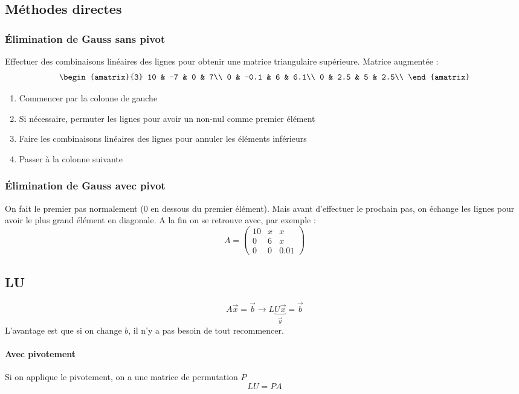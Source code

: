 \documentclass[resume]{subfiles}
\begin{document}
	\subsection{Méthodes directes}
	\subsubsection{Élimination de Gauss sans pivot}
	Effectuer des combinaisons linéaires des lignes pour obtenir une matrice triangulaire supérieure. Matrice augmentée :
	$$\begin{amatrix}{3}
10 & -7 & 0 & 7\\
0 & -0.1 & 6 & 6.1\\
0 & 2.5 & 5 & 2.5\\
\end{amatrix}$$
\begin{enumerate}
\item Commencer par la colonne de gauche
\item Si nécessaire, permuter les lignes pour avoir un non-nul comme premier élément
\item Faire les combinaisons linéaires des lignes pour annuler les éléments inférieurs
\item Passer à la colonne suivante
\end{enumerate}
\subsubsection{Élimination de Gauss avec pivot}
On fait le premier pas normalement (0 en dessous du premier élément). Mais avant d'effectuer le prochain pas, on échange les lignes pour avoir le plus grand élément en diagonale. A la fin on se retrouve avec, par exemple :
$$A=\begin{pmatrix}
10 & x & x\\
0 & 6 & x\\
0 & 0 & 0.01
\end{pmatrix}$$
\subsection{LU}
$$A\vec{x}=\vec{b}\longrightarrow L\underbrace{U\vec{x}}_{\vec{y}}=\vec{b}$$
L'avantage est que si on change $b$, il n'y a pas besoin de tout recommencer.
\paragraph{Avec pivotement}
Si on applique le pivotement, on a une matrice de permutation $P$
$$LU=PA$$
\end{document}
